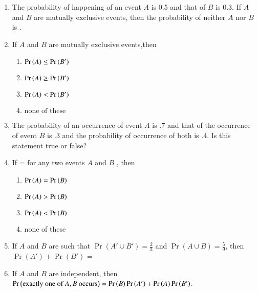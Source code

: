 \begin{enumerate}[label=\thesubsection.\arabic*,ref=\thesubsection.\theenumi,resume*]
\begin{table}[H]
\centering
\scriptsize
	
\caption{}
\label{tab:11/16/3/11}
\end{table}
		\solution
		
\item The probability of happening of an event $A$ is 0.5 and that of $B$ is 0.3. If $A$ and $B$ are mutually exclusive events, then the probability of neither $A$ nor $B$ is \underline{\phantom{Blank}}.
	\\	
\solution
		
\item If $A$ and $B$ are mutually exclusive events,then
\begin{multicols}{2}
\begin{enumerate}
\item $\Pr\left(A\right) \leq\Pr\left(B^\prime\right)$
\item $\Pr\left(A\right) \geq \Pr\left(B^\prime\right)$
\item $\Pr\left(A\right) < \Pr\left(B^\prime\right)$
\item $\text{none of these}$
\end{enumerate}
\end{multicols}
\solution 

\item The probability of an occurrence of event $A$ is .7 and that of the occurrence of event $B$ is .3 and the probability of occurrence of both is .4. Is this statement true or false?\\
\solution

\item If  =  for any two events $A$ and $B$ , then
	\begin{multicols}{4}
\begin{enumerate}
\item $\Pr\left(A\right)=\Pr\left(B\right)$
\item $\Pr\left(A\right) > \Pr\left(B\right)$
\item $\Pr\left(A\right) < \Pr\left(B\right)$
\item none of these
\end{enumerate}
\end{multicols}
\solution

\item If $A$ and $B$ are such that 
$\Pr(A' \cup B') = \frac{2}{3}$ and $\Pr(A \cup B) = \frac{5}{9}$, 
then $\Pr(A') + \Pr(B')$ = \\
\solution

\item If $A$ and $B$ are independent, then 
	$\Pr\left(\text{exactly one of } A, B \text{ occurs}\right) =\Pr\left(B\right)\Pr\left(A^{\prime}\right)+\Pr\left(A\right)\Pr\left(B^{\prime}\right)$.\\

\end{enumerate}
